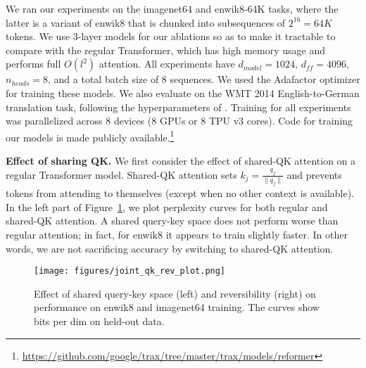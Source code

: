 \documentclass{article} \usepackage{iclr2020_conference,times}
\renewcommand{\paragraph}[1]{\textbf{#1}}
\begin{document}
We ran our experiments on the imagenet64 and enwik8-64K tasks, where the latter is a variant of enwik8 that is chunked into subsequences of $2^{16} = 64K$ tokens. We use 3-layer models for our ablations so as to make it tractable to compare with the regular Transformer, which has high memory usage and performs full $O(l^2)$ attention. All experiments have $d_{model}=1024$, $d_{ff}=4096$, $n_{heads}=8$, and a total batch size of 8 sequences. We used the Adafactor optimizer \citep{adafactor} for training these models. We also evaluate on the WMT 2014 English-to-German translation task, following the hyperparameters of \citet{transformer}. Training for all experiments was parallelized across 8 devices (8 GPUs or 8 TPU v3 cores). Code for training our models is made publicly available.\footnote{\url{https://github.com/google/trax/tree/master/trax/models/reformer}}

\paragraph{Effect of sharing QK.} \label{sec:exp_qk}
We first consider the effect of shared-QK attention on a regular Transformer model. Shared-QK attention sets $k_j = \frac{q_j}{\|q_j\|}$ and prevents tokens from attending to themselves (except when no other context is available). In the left part of Figure~\ref{fig:share-qk-rev}, we plot perplexity curves for both regular and shared-QK attention. A shared query-key space does not perform worse than regular attention; in fact, for enwik8 it appears to train slightly faster. In other words, we are not sacrificing accuracy by switching to shared-QK attention. 

\begin{figure}[t]
    \centering
    \texttt{[image: figures/joint\_qk\_rev\_plot.png]}
    \caption{Effect of shared query-key space (left) and reversibility (right) on 
    performance on enwik8 and imagenet64 training. The curves show bits per dim on held-out data.}
    \label{fig:share-qk-rev}
\end{figure}
\end{document}
